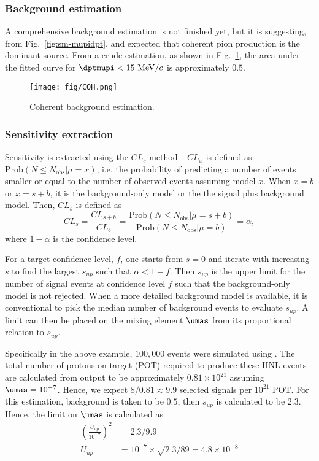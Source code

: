     
    \subsubsection{Background estimation}
        A comprehensive background estimation is not finished yet, but it is suggesting, from Fig.~\ref{fig:sm-mupidpt}, and expected that coherent pion production is the dominant source. 
        From a crude estimation, as shown in Fig.~\ref{fig:coh-bkg}, the area under the fitted curve for $\dptmupi<15~\mevc$ is approximately $0.5$. 
        \begin{figure}[!htb] 
            \centering
            \texttt{[image: fig/COH.png]}
            \caption{Coherent background estimation.}
            \label{fig:coh-bkg}
        \end{figure}    
        
    \subsubsection{Sensitivity extraction}
        Sensitivity is extracted using the $CL_s$ method~\cite{Read_2002}.
        $CL_x$ is defined as $\textrm{Prob}(N\leq N_{\textrm{obs}}| \mu = x)$, i.e. the probability of predicting a number of events smaller or equal to the number of observed events assuming model $x$. When $x=b$ or $x=s+b$, it is the background-only model or the the signal plus background model.
        Then, $CL_s$ is defined as 
        \begin{equation}
            CL_s = \frac{CL_{s+b}}{CL_{b}} = \frac{\textrm{Prob}(N\leq N_{\textrm{obs}}| \mu = s+b)}{\textrm{Prob}(N\leq N_{\textrm{obs}}| \mu = b)} = \alpha,
        \end{equation}
        where $1-\alpha$ is the confidence level.

        For a target confidence level, $f$, one starts from $s=0$ and iterate with increasing $s$ to find the largest $s_{up}$ such that $\alpha < 1-f$. 
        Then $s_{up}$ is the upper limit for the number of signal events at confidence level $f$ such that the background-only model is not rejected. 
        When a more detailed background model is available, it is conventional to pick the median number of background events to evaluate $s_{up}$.
        A limit can then be placed on the mixing element $\umas$ from its proportional relation to $s_{up}$.

        Specifically in the above example, $100,000$ \genie events were simulated using . 
        The total number of protons on target (POT) required to produce these HNL events are calculated from  output to be approximately $0.81\times10^{21}$ assuming $\umas=10^{-7}$. 
        Hence, we expect $8/0.81\approx9.9$ selected signals per $10^{21}$ POT.
        For this estimation, background is taken to be $0.5$, then $s_{up}$ is calculated to be $2.3$. 
        Hence, the limit on $\umas$ is calculated as 
        \begin{align}
            (\frac{U_{up}}{10^{-7}})^2 & =  2.3 / 9.9 \\
            U_{up} & = 10^{-7} \times \sqrt{2.3/89} = 4.8\times10^{-8}
        \end{align}

